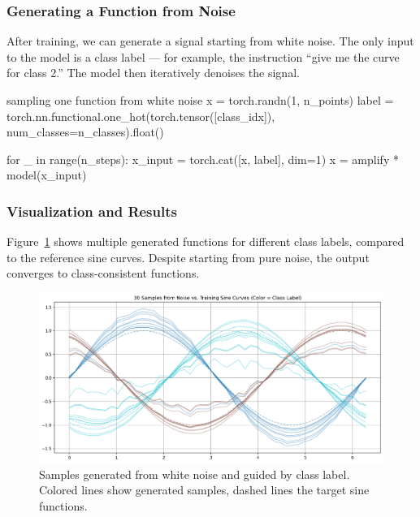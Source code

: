 \subsubsection*{Generating a Function from Noise}

After training, we can generate a signal starting from white noise. The only input to the model is a class label — for example, the instruction ``give me the curve for class 2.'' The model then iteratively denoises the signal.

\begin{codeonly}{sampling one function from white noise}
x = torch.randn(1, n_points)
label = torch.nn.functional.one_hot(torch.tensor([class_idx]), num_classes=n_classes).float()

for _ in range(n_steps):
    x_input = torch.cat([x, label], dim=1)
    x = amplify * model(x_input)
\end{codeonly}

\subsubsection*{Visualization and Results}

Figure~\ref{fig:sample-overlay} shows multiple generated functions for different class labels, compared to the reference sine curves. Despite starting from pure noise, the output converges to class-consistent functions.

\begin{figure}[h]
\centering
\includegraphics[width=\textwidth]{images/samples_vs_sines_conditioned.png}
\caption{Samples generated from white noise and guided by class label. Colored lines show generated samples, dashed lines the target sine functions.}
\label{fig:sample-overlay}
\end{figure}

